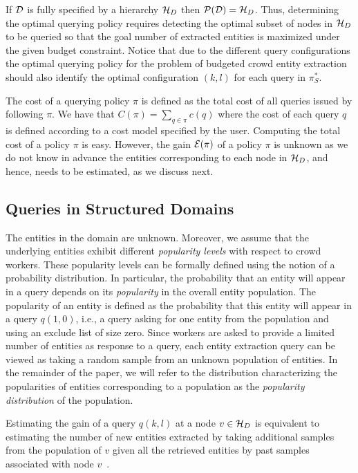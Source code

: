 If $\mathcal{D}$ is fully specified by a hierarchy $\mathcal{H}_D$ then $\mathcal{P}(\mathcal{D}) = \mathcal{H}_D$. Thus, determining the optimal querying policy requires detecting the optimal subset of nodes in $\mathcal{H}_D$ to be queried so that the goal number of extracted entities is maximized under the given budget constraint. Notice that due to the different query configurations the optimal querying policy for the problem of budgeted crowd entity extraction should also identify the optimal configuration $(k,l)$ for each query in $\pi^*_S$.

The cost of a querying policy $\pi$ is defined as the total cost of all queries issued by following $\pi$. We have that $C(\pi) = \sum_{q \in \pi} c(q)$ where the cost of each query $q$ is defined according to a cost model specified by the user. Computing the total cost of a policy $\pi$ is easy. However, the gain $\mathcal{E}(\pi)$ of a policy $\pi$ is unknown as we do not know in advance the entities corresponding to each node in $\mathcal{H}_D$, and hence, needs to be estimated, as we discuss next. 

\subsection{Queries in Structured Domains}
\label{sec:sampling}
The entities in the domain are unknown. Moreover, we assume that the underlying entities exhibit different {\em popularity levels} with respect to crowd workers. These popularity levels can be formally defined using the notion of a probability distribution. In particular, the probability that an entity will appear in a query depends on its {\em popularity} in the overall entity population. The popularity of an entity is defined as the probability that this entity will appear in a query $q(1,0)$, i.e., a query asking for one entity from the population and using an exclude list of size zero. Since workers are asked to provide a limited number of entities as response to a query, each entity extraction query can be viewed as taking a random sample from an unknown population of entities. In the remainder of the paper, we will refer to the distribution characterizing the popularities of entities corresponding to a population as the {\em popularity distribution} of the population. 

Estimating the gain of a query $q(k,l)$ at a node $v \in \mathcal{H}_D$ is equivalent to estimating the number of new entities extracted by taking additional samples from the population of $v$ given all the retrieved entities by past samples associated with node $v$~\cite{trushkowsky:2013}. 


